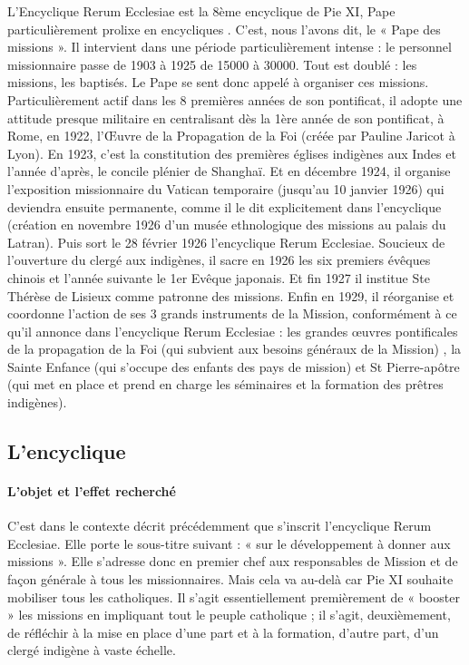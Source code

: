 L’Encyclique Rerum Ecclesiae est la 8ème encyclique de Pie XI, Pape particulièrement prolixe en encycliques  . C’est, nous l’avons dit, le « Pape des missions ». Il intervient dans une période particulièrement intense :  le personnel missionnaire passe de 1903 à 1925 de 15000 à 30000. Tout est doublé : les missions, les baptisés. Le Pape se sent donc appelé à organiser ces missions. Particulièrement actif dans les 8 premières années de son pontificat, il adopte une attitude presque militaire en centralisant dès la 1ère année de son pontificat, à Rome, en 1922, l'Œuvre de la Propagation de la Foi (créée par Pauline Jaricot à Lyon). En 1923, c’est la constitution des premières églises indigènes aux Indes et l’année d’après, le concile plénier de Shanghaï. Et en décembre 1924, il organise l’exposition missionnaire du Vatican temporaire (jusqu’au 10 janvier 1926) qui deviendra ensuite permanente, comme il le dit explicitement dans l’encyclique (création en novembre 1926 d’un musée ethnologique des missions au palais du Latran). Puis sort le 28 février 1926 l’encyclique Rerum Ecclesiae. Soucieux de l'ouverture du clergé aux indigènes, il sacre en 1926 les six premiers évêques chinois et l’année suivante le 1er Evêque japonais. Et fin 1927 il institue Ste Thérèse de Lisieux comme patronne des missions. Enfin en 1929, il réorganise et coordonne l’action de ses 3 grands instruments de la Mission, conformément à ce qu’il annonce dans l’encyclique Rerum Ecclesiae : les grandes œuvres pontificales de la propagation de la Foi (qui subvient aux besoins généraux de la Mission) ,  la Sainte Enfance (qui s’occupe des enfants des pays de mission) et St Pierre-apôtre (qui met en place et prend en charge les séminaires et la formation des prêtres indigènes). 

\subsection{L’encyclique}
\paragraph{L’objet et l’effet recherché}

C’est dans le contexte décrit précédemment que s’inscrit l’encyclique Rerum Ecclesiae. Elle porte le sous-titre suivant : « sur le développement à donner aux missions ». Elle s’adresse donc en premier chef aux responsables de Mission et de façon générale à tous les missionnaires. Mais cela va au-delà car Pie XI souhaite mobiliser tous les catholiques.
Il s’agit essentiellement premièrement de « booster » les missions en impliquant tout le peuple catholique ; il s’agit, deuxièmement, de réfléchir à la mise en place d’une part et à la formation, d’autre part, d’un clergé indigène à vaste échelle.


